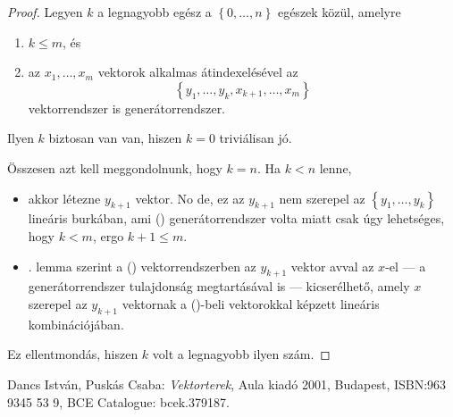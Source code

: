 \documentclass[9pt,showtrims]{memoir}
\let\Aref\relax
\theoremstyle{plain}
\theoremstyle{remark}
\theoremstyle{definition}
\begin{document}
\begin{proof}
    Legyen $k$ a legnagyobb egész a $\left\{ 0,\dots,n \right\}$ egészek közül, amelyre
    \begin{enumerate}
        \item $k\leq m$, és
        \item az $x_1,\dots,x_m$ vektorok alkalmas átindexelésével az
            \[
                \left\{ y_1,\dots,y_k,x_{k+1},\dots,x_m \right\}\tag{\dag}
            \]
            vektorrendszer is generátorrendszer.
    \end{enumerate}
    Ilyen $k$ biztosan van van, hiszen $k=0$ triviálisan jó.

    Összesen azt kell meggondolnunk, hogy $k=n$.
    Ha $k<n$ lenne, 
    \begin{itemize}
        \item 
        akkor létezne $y_{k+1}$ vektor.
        No de, ez az $y_{k+1}$ nem szerepel az $\left\{ y_1,\dots,y_k \right\}$ lineáris burkában,
        ami (\dag) generátorrendszer volta miatt csak úgy lehetséges, hogy $k<m$, 
        ergo $k+1\leq m$.
        \item
        \Aref{le:gencsere}. lemma szerint a (\dag) vektorrendszerben az $y_{k+1}$ vektor 
        avval az $x$-el
        --- a generátorrendszer tulajdonság megtartásával is --- 
        kicserélhető, 
        amely $x$ szerepel az $y_{k+1}$ vektornak a (\dag)-beli
        vektorokkal képzett lineáris kombinációjában. 
    \end{itemize}
    Ez ellentmondás, hiszen $k$ volt a legnagyobb ilyen szám.
\end{proof}
\begin{thebibliography}{MMMMMMMMM}
        Dancs István, Puskás Csaba: \textit{Vektorterek}, Aula kiadó 2001, Budapest, ISBN:963 9345 53 9, BCE Catalogue: bcek.379187.
\end{thebibliography}
\printindex
\end{document}
